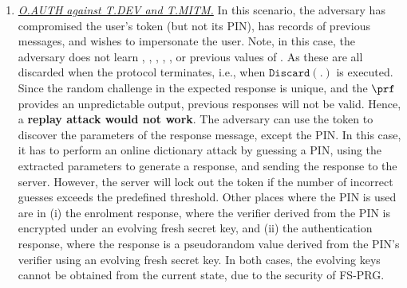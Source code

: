 \begin{enumerate}[leftmargin=5.5mm]
\item\underline{\textit{O.AUTH against T.DEV and T.MITM.}}\label{O.AUTH:T.DEV-plus-T.MITM}
In this scenario, the adversary has compromised the user's token (but not its PIN), has records of previous messages, and wishes to impersonate the user. Note, in this case, the adversary does not learn \VC{\verifier}, \VM{\trans}, \VC{\pin}, , ,  or previous values of \VC{\state}. As these are all discarded when the protocol terminates, i.e., when $\mathtt{Discard}(.)$ is executed. 
%
Since the random challenge in the expected response is unique, and the $\prf$ provides an unpredictable output, previous responses will not be valid. Hence, a \textbf{replay attack would not work}. The adversary can use the token to discover the parameters of the response message, except the PIN. In this case, it has to perform an online dictionary attack by guessing a PIN, using the extracted parameters to generate a response, and sending the response to the server. However, the server will lock out the token if the number of incorrect guesses exceeds the predefined threshold. Other places where the PIN is used are in (i) the enrolment response, where the verifier derived from the PIN is encrypted under an evolving fresh secret key, and (ii) the authentication response, where the response is a pseudorandom value derived from the PIN's verifier using an evolving fresh secret key. In both cases, the evolving keys cannot be obtained from the current state, due to the security of FS-PRG. 




\end{enumerate}
